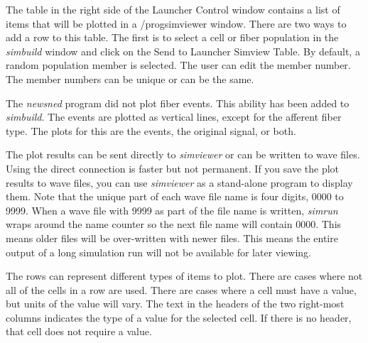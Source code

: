 \documentclass[12pt,openany,oneside]{book}
\newcommand{\prog}[1]{\textit{{#1}}}
\begin{document}
The table in the right side of the Launcher Control window contains a list
of items that will be plotted in a /prog{simviewer} window. There are two
ways to add a row to this table. The first is to select a cell 
or fiber population
in the \prog{simbuild} window and click on the Send to Launcher Simview
Table.  By default, a random population member is selected. The user can
edit the member number. The member numbers can be unique or can be the
same.

The \prog{newsned} program did not plot fiber events. This ability
has been added to \prog{simbuild}. The events are plotted as vertical 
lines, except for the afferent fiber type. The plots for this are
the events, the original signal, or both.

The plot results can be sent directly to \prog{simviewer} or can be
written to wave files. Using the direct connection is faster but not
permanent. If you save the plot results to wave files, you can use
\prog{simviewer} as a stand-alone program to display them. Note that 
the unique part of each wave file name is four digits, 0000 to 9999. When
a wave file with 9999 as part of the file name is written, \prog{simrun}
wraps around the name counter so the next file name will contain 0000.
This means older files will be over-written with newer files. This means
the entire output of a long simulation run will not be available for later
viewing.

The rows can represent different types of items to plot. There are cases
where not all of the cells in a row are used. There are cases where a cell
must have a value, but units of the value will vary.  The text in the
headers of the two right-most columns indicates the type of a value for
the selected cell. If there is no header, that cell does not require a
value.
\end{document}
